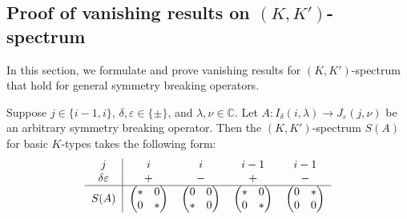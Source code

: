 \subsection{Proof of vanishing results on $(K,K')$-spectrum}
In this section,
 we formulate and prove vanishing results
 for $(K,K')$-spectrum
 that hold for general symmetry breaking operators.  
\begin{proposition}
\label{prop:CApm1}
Suppose $j \in \{i-1,i\}$, 
$\delta, \varepsilon \in \{\pm\}$, 
 and $\lambda, \nu \in {\mathbb{C}}$.  
Let $A:I_{\delta}(i,\lambda) \to J_{\varepsilon}(j,\nu)$
 be an arbitrary symmetry breaking operator.  
Then the $(K,K')$-spectrum $S(A)$
 for basic $K$-types takes the following form:
\begin{equation*}
\begin{tabular}{c|cccc}
$j$
&$i$
&$i$
&$i-1$
&$i-1$
\\
$\delta\varepsilon$
&$+$
&$-$
&$+$
&$-$
\\
\hline
$S(A)$ 
& $\begin{pmatrix} \ast & 0 \\ 0 & \ast \end{pmatrix}$
& $\begin{pmatrix} 0    & 0 \\ \ast & 0 \end{pmatrix}$
& $\begin{pmatrix} \ast & 0 \\ 0 & \ast \end{pmatrix}$
& $\begin{pmatrix} 0 & \ast \\ 0 & 0 \end{pmatrix}$
\end{tabular}
\end{equation*}
\end{proposition}


